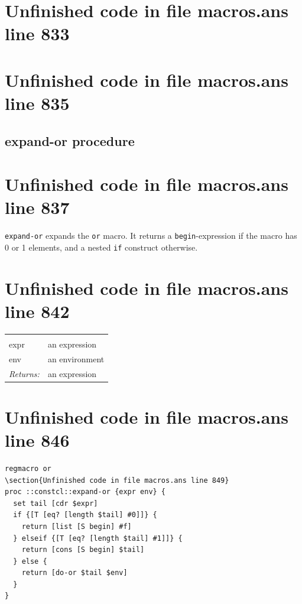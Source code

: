 \documentclass[twoside,9pt]{report}
\begin{document}
\section{Unfinished code in file macros.ans line 833}
\section{Unfinished code in file macros.ans line 835}
\subsection{expand-or procedure}
\label{expand-or-procedure}
\section{Unfinished code in file macros.ans line 837}


\texttt{expand-or} expands the \texttt{or} macro. It returns a \texttt{begin}-expression if the macro has 0 or 1 elements, and a nested \texttt{if} construct otherwise.

\section{Unfinished code in file macros.ans line 842}
\noindent\begin{tabular}{ |p{1.9cm} p{8cm}| }
\hline
\rowcolor[HTML]{CCCCCC} \multicolumn{2}{|l|}{\bf expand-or (internal)} \\
expr & an expression \\
env & an environment \\
\textit{Returns:} & an expression \\
\hline
\end{tabular}
\section{Unfinished code in file macros.ans line 846}
\begin{lstlisting}
regmacro or
\section{Unfinished code in file macros.ans line 849}
proc ::constcl::expand-or {expr env} {
  set tail [cdr $expr]
  if {[T [eq? [length $tail] #0]]} {
    return [list [S begin] #f]
  } elseif {[T [eq? [length $tail] #1]]} {
    return [cons [S begin] $tail]
  } else {
    return [do-or $tail $env]
  }
}
\end{lstlisting}
\end{document}
